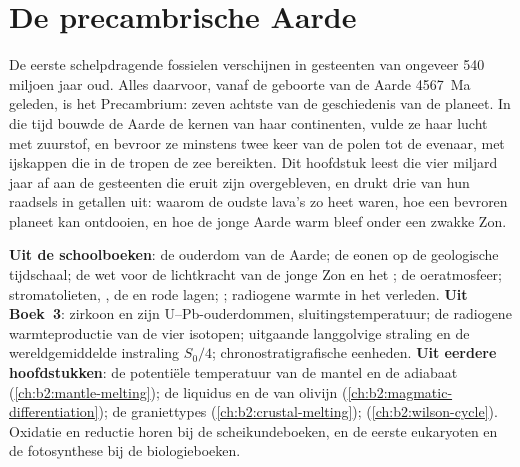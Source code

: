 \chapter{De precambrische Aarde}\label{ch:b2:precambrian-earth}

De eerste schelpdragende fossielen verschijnen in gesteenten van ongeveer 540 miljoen jaar oud. Alles daarvoor, vanaf
de geboorte van de Aarde \qty{4567}{Ma} geleden, is het Precambrium: zeven achtste van de geschiedenis
van de planeet. In die tijd bouwde de Aarde de kernen van haar continenten, vulde ze haar lucht met zuurstof,
en bevroor ze minstens twee keer van de polen tot de evenaar, met ijskappen die in de tropen
de zee bereikten. Dit hoofdstuk leest die vier miljard jaar af aan de gesteenten die eruit zijn overgebleven,
en drukt drie van hun raadsels in getallen uit: waarom de oudste lava's zo heet waren, hoe een bevroren
planeet kan ontdooien, en hoe de jonge Aarde warm bleef onder een zwakke Zon.

\begin{recall}
\textbf{Uit de schoolboeken}: de ouderdom van de Aarde; de eonen op de geologische tijdschaal;
de wet voor de lichtkracht van de jonge Zon en het ; de oeratmosfeer;
stromatolieten, , de  en rode lagen; ;
radiogene warmte in het verleden. \textbf{Uit Boek~3}: zirkoon en zijn U--Pb-ouderdommen,
sluitingstemperatuur; de radiogene warmteproductie van de vier isotopen; uitgaande langgolvige
straling en de wereldgemiddelde instraling $S_0/4$; chronostratigrafische eenheden.
\textbf{Uit eerdere hoofdstukken}: de potentiële temperatuur van de mantel en de adiabaat
(\cref{ch:b2:mantle-melting}); de liquidus en de  van olivijn
(\cref{ch:b2:magmatic-differentiation}); de graniettypes (\cref{ch:b2:crustal-melting});
 (\cref{ch:b2:wilson-cycle}). Oxidatie en reductie horen bij de
scheikundeboeken, en de eerste eukaryoten en de fotosynthese bij de biologieboeken.
\end{recall}

